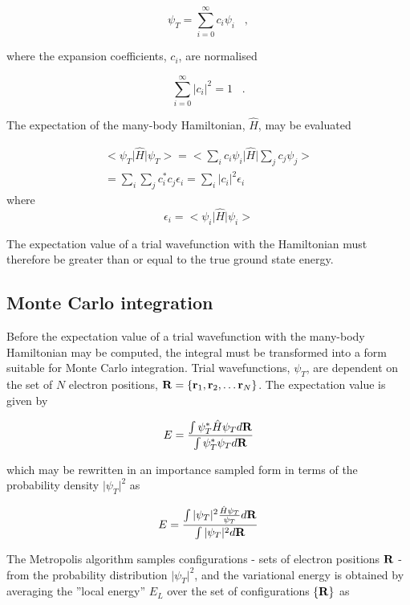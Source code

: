 \documentclass{article}
\begin{document}
\begin{equation}
 \psi_T=\sum_{i=0}^{\infty} c_{i} \psi_i \;\;\;,
\end{equation}

where the expansion coefficients, $c_{i}$, are normalised 

\begin{equation}
\sum_{i=0}^{\infty} \vert c_{i}\vert^2=1 \;\;\;.
\end{equation}

The expectation of the many-body Hamiltonian, $\hat{H}$, may be evaluated 

\begin{align}
 <\psi_T\vert\hat{H}\vert\psi_T >  = <\sum_i c_i\psi_i\vert\hat{H}\vert\sum_j c_j\psi_j > \\
 = \sum_i \sum_j c_{i}^{*} c_{j} \epsilon_{i} = \sum_i \vert c_{i}\vert^{2} \epsilon_{i}
\end{align}
where 
\begin{equation}
 \epsilon_{i} = <\psi_i\vert\hat{H}\vert\psi_i >
\end{equation}

The expectation value of a trial wavefunction with the Hamiltonian must therefore be greater than or equal to the true ground state energy.

\subsection{Monte Carlo integration}
Before the expectation value of a trial wavefunction with the many-body Hamiltonian may be computed, the integral must be transformed into a form suitable for Monte Carlo integration. Trial wavefunctions, $\psi_T$, are dependent on the set of $N$ electron positions,  ${\bf R}=\{{\bf r}_1,{\bf r}_2, \ldots {\bf r}_N\}$. The expectation value is given by

\begin{equation}
E=\frac{\int \psi_{T}^{*}\hat{H}\psi_{T} d{\bf R}}
{\int \psi_{T}^{*}\psi_{T}d{\bf R}}
\end{equation}

which may be rewritten in an importance sampled form in terms of the probability density  $\vert\psi_{T}\vert^{2}$ as

\begin{equation}
E=\frac{\int \vert\psi_{T}\vert^{2}\frac{\hat{H}\psi_{T}}{\psi_{T}} d{\bf R}}
{\int \vert\psi_{T}\vert^{2}d{\bf R}}
\end{equation}

The Metropolis algorithm samples configurations - sets of electron positions ${\bf R}$ - from the probability distribution  $\vert\psi_{T}\vert^{2}$, and the variational energy is obtained by averaging the ''local energy'' $E_{L}$ over the set of configurations $\{{\bf R}\}$ as 
\end{document}
